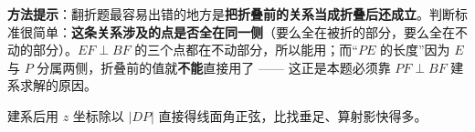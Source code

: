 \begin{answer}
\begin{gktip}
\textbf{方法提示}：翻折题最容易出错的地方是\textbf{把折叠前的关系当成折叠后还成立}。判断标准很简单：\textbf{这条关系涉及的点是否全在同一侧}（要么全在被折的部分，要么全在不动的部分）。$EF\perp BF$ 的三个点都在不动部分，所以能用；而“$PE$ 的长度”因为 $E$ 与 $P$ 分属两侧，折叠前的值就\textbf{不能}直接用了 —— 这正是本题必须靠 $PF\perp BF$ 建系求解的原因。

建系后用 $z$ 坐标除以 $|DP|$ 直接得线面角正弦，比找垂足、算射影快得多。
\end{gktip}



\par\medskip

\end{answer}
